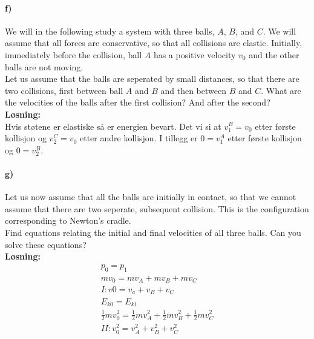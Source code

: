\documentclass[11pt, A4paper,norsk]{article}
\begin{document}
		\paragraph{f)}
			\begin{flushleft}
We will in the following study a system with three balls, $A$, $B$, and $C$. We will assume that all forces are conservative, so that all collisions are elastic. Initially, immediately before the collision, ball $A$ has a positive velocity $v_0$ and the other balls are not moving. \\
Let us assume that the balls are seperated by small distances, so that there are two collisions, first between ball $A$ and $B$ and then between $B$ and $C$. What are the velocities of the balls after the first collision? And after the second? \\
\vspace{1mm}
\textbf{Løsning:} \\
\vspace{1mm}
Hvis støtene er elastiske så er energien bevart. Det vi si at $v_1^B = v_0$ etter første kollisjon og $v_2^C = v_0$ etter andre kollisjon. I tillegg er $0 = v_1^A$ etter første kollisjon og $0 = v_2^B$.
			\end{flushleft}

















		\paragraph{g)}
			\begin{flushleft}
Let us now assume that all the balls are initially in contact, so that we cannot assume that there are two seperate, subsequent collision. This is the configuration corresponding to Newton’s cradle. \\
Find equations relating the initial and final velocities of all three balls. Can you
solve these equations? \\
\vspace{1mm}
\textbf{Løsning:} \\
\vspace{1mm}
				\begin{align}
p_0 = p_1 \nonumber \\
mv_0 = mv_A + mv_B + mv_C \nonumber \\
I: v0 = v_a + v_B + v_C \nonumber \\
E_{k0} = E_{k1} \nonumber \\
\frac{1}{2}mv_0^2 = \frac{1}{2}mv_A^2 + \frac{1}{2}mv_B^2 + \frac{1}{2}mv_C^2 \nonumber \\
II: v_0^2 = v_A^2 + v_B^2 + v_C^2 \nonumber
				\end{align}
			\end{flushleft}
\end{document}
